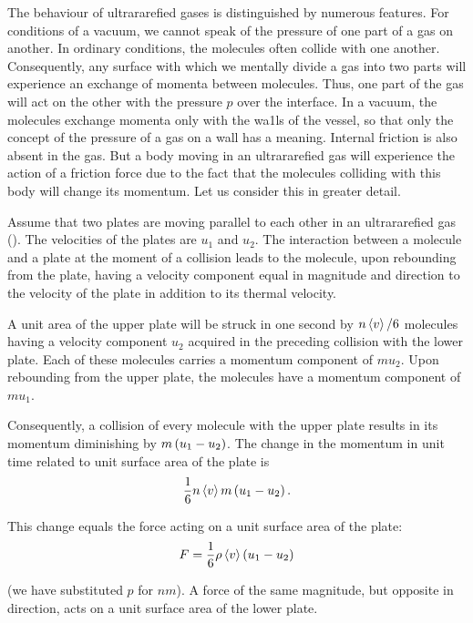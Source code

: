 The behaviour of ultrararefied gases is distinguished by numerous features. For conditions of a vacuum, we cannot speak of the pressure of one part of a gas on another. In ordinary conditions, the molecules often collide with one another. Consequently, any surface with which we mentally divide a gas into two parts will experience an exchange of momenta between molecules. Thus, one part of the gas will act on the other with the pressure $p$ over the interface. In a vacuum, the molecules exchange momenta only with the wa1ls of the vessel, so that only the concept of the pressure of a gas on a wall has a meaning. Internal friction is also absent in the gas. But a body moving in an ultrararefied gas will experience the action of a friction force due to the fact that the molecules colliding with this body will change its momentum. Let us consider this in greater detail.

Assume that two plates are moving parallel to each other in an ultrararefied gas (). The velocities of the plates are $u_1$ and $u_2$. The interaction between a molecule and a plate at the moment of a collision leads to the molecule, upon rebounding from the plate, having a velocity component equal in magnitude and direction to the velocity of the plate in addition to its thermal velocity.

A unit area of the upper plate will be struck in one second by $n\left\langle v \right\rangle/6$ molecules having a velocity component $u_2$ acquired in the preceding collision with the lower plate. Each of these molecules carries a momentum component of $mu_2$. Upon rebounding from the upper plate, the molecules have a momentum component of $mu_1$.

Consequently, a collision of every molecule with the upper plate results in its momentum diminishing by $m\left(u_1-u_2\right)$. The change in the momentum in unit time related to unit surface area of the plate is
\begin{equation*}
    \frac{1}{6} n \left\langle v \right\rangle m \left(u_1-u_2\right).
\end{equation*}

\noindent
This change equals the force acting on a unit surface area of the plate:
\begin{equation}\label{eq:16_31}
    F = \frac{1}{6} \rho \left\langle v \right\rangle \left(u_1-u_2\right)
\end{equation}

\noindent
(we have substituted $p$ for $nm$). A force of the same magnitude, but opposite in direction, acts on a unit surface area of the lower plate.

